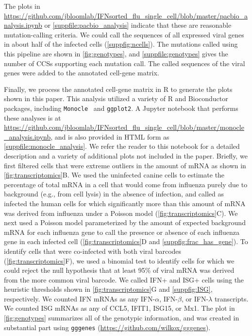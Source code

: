 \documentclass[10pt,letterpaper]{article}
\newcommand{\FIG}[1]{\autoref{fig:#1}}
\newcommand{\SUPPFILE}[1]{\autoref{suppfile:#1}}
\newcommand{\SUPPFIG}[1]{\autoref{suppfig:#1}}
\begin{document}
The plots in \url{https://github.com/jbloomlab/IFNsorted_flu_single_cell/blob/master/pacbio_analysis.ipynb} or \SUPPFILE{pacbio_analysis} indicate that these are reasonable mutation-calling criteria.
We could call the sequences of all expressed viral genes in about half of the infected cells (\SUPPFIG{ncells}).
The mutations called using this pipeline are shown in \FIG{genotypes}, and \SUPPFILE{genotypes} gives the number of CCSs supporting each mutation call.
The called sequences of the viral genes were added to the annotated cell-gene matrix.

Finally, we process the annotated cell-gene matrix in R to generate the plots shown in this paper.
This analysis utilized a variety of R and Bioconductor~\cite{huber2015orchestrating} packages, including \texttt{Monocle}~\cite{qiu2017reversed, trapnell2014dynamics} and \texttt{ggplot2}.
A Jupyter notebook that performs these analyses is at \url{https://github.com/jbloomlab/IFNsorted_flu_single_cell/blob/master/monocle_analysis.ipynb}, and is also provided in HTML form as \SUPPFILE{monocle_analysis}.
We refer the reader to this notebook for a detailed description and a variety of additional plots not included in the paper.
Briefly, we first filtered cells that were extreme outliers in the amount of mRNA as shown in \FIG{transcriptomics}B.
We used the uninfected canine cells to estimate the percentage of total mRNA in a cell that would come from influenza purely due to background (e.g., from cell lysis) in the absence of infection, and called as infected the human cells for which significantly more than this amount of mRNA was derived from influenza under a Poisson model (\FIG{transcriptomics}C).
We next used a Poisson model parameterized by the amount of expected background mRNA for each influenza gene to call the presence or absence of each influenza gene in each infected cell (\FIG{transcriptomics}D and \SUPPFIG{frac_has_gene}). 
To identify cells that were co-infected with both viral barcodes (\FIG{transcriptomics}F), we used a binomial test to identify cells for which we could reject the null hypothesis that at least 95\% of viral mRNA was derived from the more common viral barcode.
We called IFN+ and ISG+ cells using the heuristic thresholds shown in \FIG{transcriptomics}G and \SUPPFIG{ISG}, respectively.
We counted IFN mRNAs as any IFN-$\alpha$, IFN-$\beta$, or IFN-$\lambda$ transcripts.
We counted ISG mRNAs as any of CCL5, IFIT1, ISG15, or Mx1.
The plot in \FIG{genotypes} summarizes all of the genotypic information, and was created in substantial part using \texttt{gggenes} (\url{https://github.com/wilkox/gggenes}).
\end{document}
